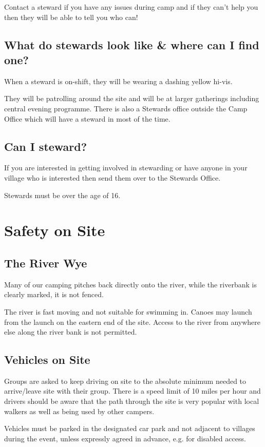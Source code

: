 \documentclass[a4paper, 11pt]{report}
\begin{document}
Contact a steward if you have any issues during camp and if they can't help you then they will be able to tell you who can!

\section{What do stewards look like \& where can I find one?}
When a steward is on-shift, they will be wearing a dashing yellow hi-vis.\nl

They will be patrolling around the site and will be at larger gatherings including central evening programme.  There is also a Stewards office outside the Camp Office which will have a steward in most of the time. 

\section{Can I steward?}
If you are interested in getting involved in stewarding or have anyone in your village who is interested then send them over to the Stewards Office.\nl

Stewards must be over the age of 16.

\chapter{Safety on Site}
\section{The River Wye}
Many of our camping pitches back directly onto the river, while the riverbank is clearly marked, it is not fenced. \nl

The river is fast moving and not suitable for swimming in. Canoes may launch from the launch on the eastern end of the site. Access to the river from anywhere else along the river bank is not permitted. 

\section{Vehicles on Site}
Groups are asked to keep driving on site to the absolute minimum needed to arrive/leave site with their group.  There is a speed limit of 10 miles per hour and drivers should be aware that the path through the site is very popular with local walkers as well as being used by other campers.\nl

Vehicles must be parked in the designated car park and not adjacent to villages during the event, unless expressly agreed in advance, e.g. for disabled access.
\end{document}
